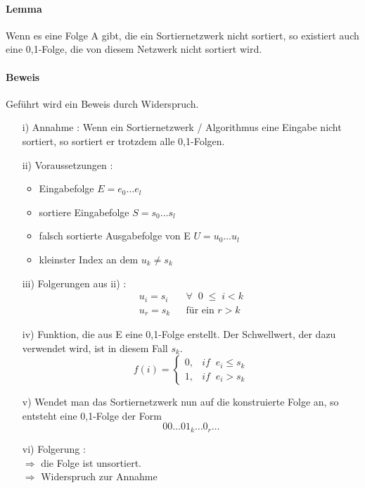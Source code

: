 \documentclass[11pt,ngerman]{article}
\begin{document}
\paragraph{Lemma}
Wenn es eine Folge A gibt, die ein Sor\-tier\-netz\-werk nicht sortiert, so existiert auch eine 0,1-Folge, die von diesem Netzwerk nicht sortiert wird.
\paragraph{Beweis} Geführt wird ein Beweis durch Widerspruch. 
\begin{enumerate}
\item[i)] Annahme : Wenn ein Sortiernetzwerk / Algorithmus eine Eingabe nicht sortiert, so sortiert er trotzdem alle 0,1-Folgen.
\item[ii)] Voraussetzungen : \begin{itemize}
\item Eingabefolge $E = e_0 \dots e_l$
\item sortiere Eingabefolge $ S = s_0 \dots s_l$
\item falsch sortierte Ausgabefolge von E $ U = u_0 \dots u_l $
\item kleinster Index an dem $u_k \neq s_k$ 
\end{itemize}
\item[iii)] Folgerungen aus ii) :
\begin{eqnarray}
u_i = s_i & & \forall \;\;  0 \; \leq\; i < k \\
u_r = s_k & & \text{für ein } r > k
\end{eqnarray}
\item[iv)] Funktion, die aus E eine 0,1-Folge erstellt. Der Schwellwert, der dazu verwendet wird, ist in diesem Fall $s_k$.
\begin{equation}
f(i) = \begin{cases} 0 , & if \;\; e_i \leq s_k \\
    1 , & if \;\; e_i > s_k
    \end{cases}
\label{eq:cases}
\end{equation}
\item[v)] Wendet man das Sortiernetzwerk nun auf die konstruierte Folge an, so entsteht eine 0,1-Folge der Form 
\begin{equation}
00 \dots 01_k\dots0_r \dots
\label{eq:01folge}
\end{equation}
\item[vi)] Folgerung : \\
$\Rightarrow$ die Folge ist unsortiert.\\
$\Rightarrow$ Widerspruch zur Annahme
\end{enumerate}
\end{document}
